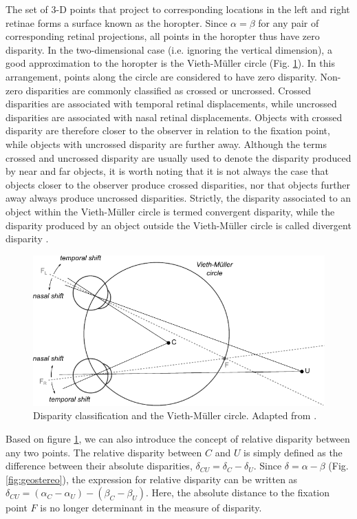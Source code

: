 The set of 3-D points that project to corresponding locations in the left and right retinae forms a surface known as the horopter. Since $\alpha=\beta$ for any pair of corresponding retinal projections, all points in the horopter thus have zero disparity. In the two-dimensional case (i.e. ignoring the vertical dimension), a good approximation to the horopter is the Vieth-M{\"u}ller circle (Fig. \ref{fig:dispclass}). In this arrangement, points along the circle are considered to have zero disparity. Non-zero disparities are commonly classified as crossed or uncrossed. Crossed disparities are associated with temporal retinal displacements, while uncrossed disparities are associated with nasal retinal displacements. Objects with crossed disparity are therefore closer to the observer in relation to the fixation point, while objects with uncrossed disparity are further away. Although the terms crossed and uncrossed disparity are usually used to denote the disparity produced by near and far objects, it is worth noting that it is not always the case that objects closer to the observer produce crossed disparities, nor that objects further away always produce uncrossed disparities. Strictly, the disparity associated to an object within the Vieth-M{\"u}ller circle is termed convergent disparity, while the disparity produced by an object outside the Vieth-M{\"u}ller circle is called divergent disparity \cite{howard2008seeing}.

\begin{figure}
  \centering
  \includegraphics{disparity-classification}
  \caption[Disparity classification and the Vieth-M{\"u}ller circle.]{Disparity classification and the Vieth-M{\"u}ller circle. Adapted from \cite{howard2008seeing}.}
  \label{fig:dispclass}
\end{figure}

Based on figure \ref{fig:dispclass}, we can also introduce the concept of relative disparity between any two points. The relative disparity between $C$ and $U$ is simply defined as the difference between their absolute disparities, $\delta_{CU} = \delta_{C} - \delta_{U}$. Since $\delta  = \alpha - \beta$ (Fig. \ref{fig:geostereo}), the expression for relative disparity can be written as $\delta_{CU} = (\alpha_C-\alpha_U) - (\beta_C-\beta_U)$. Here, the absolute distance to the fixation point $F$ is no longer determinant in the measure of disparity.

